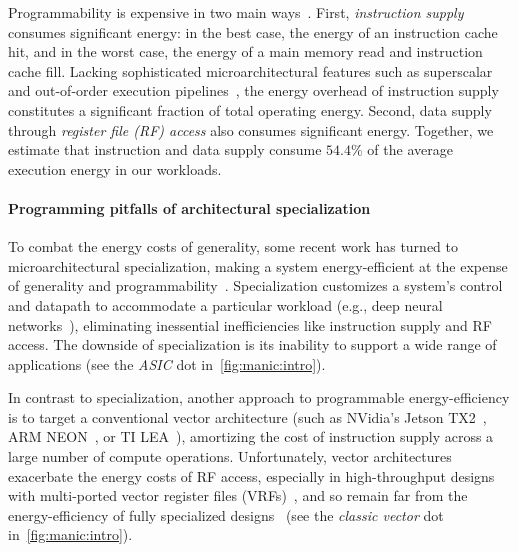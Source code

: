 Programmability is expensive in two main ways~\cite{horowitz:isscc14:energy-keynote,hameed2010understanding,balfour_elm_thesis}.
First, \emph{instruction supply} consumes significant energy: in the best case, the energy of
an instruction cache hit, and in the worst case, the energy of a main memory
read and instruction cache fill.  
%
Lacking sophisticated microarchitectural features such as superscalar and
out-of-order execution pipelines~\cite{msp430fr5994,traber2016pulpino}, the energy overhead of
instruction supply constitutes a significant fraction of total operating energy.
%
Second, data supply through \emph{register file (RF) access} also consumes significant energy.
%
Together, we estimate that instruction and data supply consume
$54.4\%$ of the average execution energy in our workloads.

\paragraph{Programming pitfalls of architectural specialization}
To combat the energy costs of generality, some recent work has turned to
microarchitectural specialization, making a system energy-efficient at the
expense of generality and
programmability~\cite{chen:isca16:eyeriss,chen:asplos14:diannao,du:isca15:shidiannao,liu:isca15:pudiannao,chen2014dadiannao,venkatesh2010conservation}.
% 
Specialization customizes a system's control and datapath to accommodate a
particular workload (e.g., deep neural networks~\cite{chen:isca16:eyeriss,chen:asplos14:diannao}),
eliminating inessential inefficiencies like instruction supply and RF access.
% 
The downside of specialization is its 
inability to support a wide range of applications (see the \textit{ASIC} dot in~\autoref{fig:manic:intro}).

In contrast to specialization, another approach to programmable
energy-efficiency is to target a conventional vector architecture (such as
NVidia's Jetson TX2~\cite{jetsontx2}, ARM NEON~\cite{neon}, or TI LEA~\cite{lea}), amortizing the cost of instruction
supply across a large number of compute operations. Unfortunately,
vector architectures exacerbate the energy costs of RF access,
especially in high-throughput designs with multi-ported vector register files (VRFs)~\cite{kozyrakis2003overcoming,asanovic1996t0,iram},
and so remain far from the energy-efficiency of fully specialized designs~\cite{hameed2010understanding} (see the \textit{classic vector} dot in~\autoref{fig:manic:intro}).

